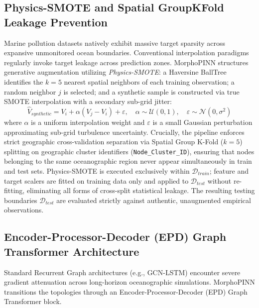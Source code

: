 \documentclass[conference]{IEEEtran}
\begin{document}
\subsection{Physics-SMOTE and Spatial GroupKFold Leakage Prevention}
Marine pollution datasets natively exhibit massive target sparsity across expansive unmonitored ocean boundaries. Conventional interpolation paradigms regularly invoke target leakage across prediction zones. MorphoPINN structures generative augmentation utilizing \textit{Physics-SMOTE}: a Haversine BallTree identifies the $k=5$ nearest spatial neighbors of each training observation; a random neighbor $j$ is selected; and a synthetic sample is constructed via true SMOTE interpolation with a secondary sub-grid jitter:
\begin{equation}
    \hat{V}_{synthetic} = V_i + \alpha (V_j - V_i) + \varepsilon, \quad \alpha \sim \mathcal{U}(0,1), \quad \varepsilon \sim \mathcal{N}(0, \sigma^2)
\end{equation}
where $\alpha$ is a uniform interpolation weight and $\varepsilon$ is a small Gaussian perturbation approximating sub-grid turbulence uncertainty. Crucially, the pipeline enforces strict geographic cross-validation separation via Spatial Group K-Fold ($k=5$) splitting on geographic cluster identifiers (\texttt{Node\_Cluster\_ID}), ensuring that nodes belonging to the same oceanographic region never appear simultaneously in train and test sets. Physics-SMOTE is executed exclusively within $\mathcal{D}_{train}$; feature and target scalers are fitted on training data only and applied to $\mathcal{D}_{test}$ without re-fitting, eliminating all forms of cross-split statistical leakage. The resulting testing boundaries $\mathcal{D}_{test}$ are evaluated strictly against authentic, unaugmented empirical observations.

\subsection{Encoder-Processor-Decoder (EPD) Graph Transformer Architecture}
Standard Recurrent Graph architectures (e.g., GCN-LSTM) encounter severe gradient attenuation across long-horizon oceanographic simulations. MorphoPINN transitions the topologies through an Encoder-Processor-Decoder (EPD) Graph Transformer block.
\end{document}
